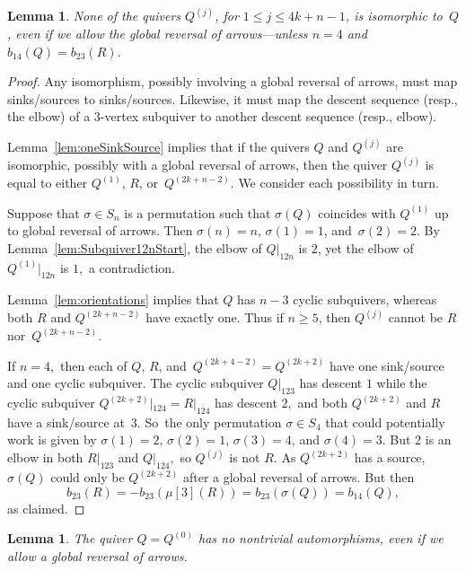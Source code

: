 \documentclass[11pt, letterpaper]{amsart}
\newtheorem{lemma}[theorem]{Lemma}
\theoremstyle{definition}
\numberwithin{equation}{section}
\newcommand{\T}[2]{\mu[#1](#2)} %
\begin{document}
\begin{lemma}
\label{lem:QDistinct} 
None of the quivers $Q^{(j)}$, for $1\le j\le 4k+n-1$, is isomorphic to~$Q$,
even if we allow the global reversal of arrows---unless $n=4$ and $b_{14}(Q)=b_{23}(R)$.
\end{lemma}

\begin{proof}
Any isomorphism, possibly involving a global reversal of arrows, must map sinks/sources to sinks/sources. 
Likewise, it must map the descent sequence (resp., the elbow) of a $3$-vertex subquiver 
to another descent sequence (resp., elbow). 

Lemma~\ref{lem:oneSinkSource} implies that if the quivers $Q$ and $Q^{(j)}$ are isomorphic, possibly with a global reversal of arrows, 
then the quiver $Q^{(j)}$ is equal to either $Q^{(1)}$, $R$, or~$Q^{(2k+n-2)}$. 
We consider each possibility in turn.

Suppose that $\sigma\in S_n$ is a permutation such that 
$\sigma(Q)$ coincides with $Q^{(1)}$ up to global reversal of arrows.
Then ${\sigma(n) = n}$, ${\sigma(1) = 1}$, and~${\sigma(2) = 2}$. 
By Lemma~\ref{lem:Subquiver12nStart}, the elbow of $Q|_{12n}$ is $2$, 
yet the elbow of $Q^{(1)}|_{12n}$ is $1,$ a contradiction.

Lemma~\ref{lem:orientations} implies that $Q$ has $n-3$ cyclic subquivers, whereas both %
$R$ and $Q^{(2k+n-2)}$ have exactly one. 
Thus if $n\geq 5$, then $Q^{(j)}$ cannot be $R$ nor~$Q^{(2k+n-2)}$. 

If $n=4,$ then each of $Q$, $R$, and~$Q^{(2k+4-2)}=Q^{(2k+2)}$ have one sink/source and one cyclic subquiver.
The cyclic subquiver $Q|_{123}$ has descent $1$ while the cyclic subquiver $Q^{(2k+2)}|_{124} = R|_{124}$ has descent $2,$ 
and both $Q^{(2k+2)}$ and $R$ have a sink/source at~$3$.
So~the only permutation $\sigma\in S_4$ that could potentially work is given by 
$\sigma(1) = 2$, $\sigma(2)=1$, $\sigma(3)=4$, and $\sigma(4)=3$.  
But $2$ is an elbow in both $R|_{123}$ and $Q|_{124},$ so $Q^{(j)}$ is not $R$.
As $Q^{(2k+2)}$ has a source, $\sigma(Q)$ could only be $Q^{(2k+2)}$ after a global reversal of arrows. 
But then
\[
b_{23}(R) = -b_{23}(\T{3}{R}) = b_{23}(\sigma(Q)) = b_{14}(Q),
\]
as claimed. 
\end{proof}

\pagebreak[3]

\begin{lemma}
\label{lem:QAutomorphisms}
The quiver $Q=Q^{(0)}$ has no nontrivial automorphisms, even if we allow a global reversal of arrows.
\end{lemma}
\end{document}
